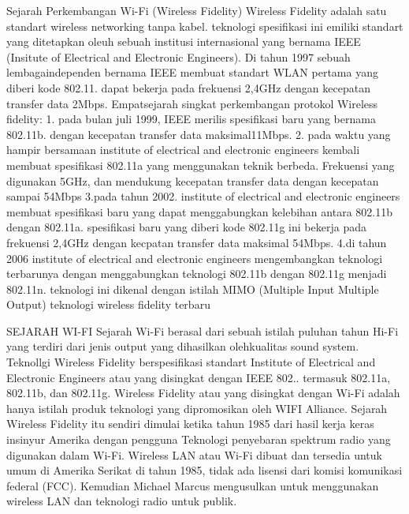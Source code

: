 Sejarah Perkembangan Wi-Fi (Wireless Fidelity)
Wireless Fidelity adalah satu standart wireless networking tanpa kabel. teknologi spesifikasi ini emiliki standart yang ditetapkan oleuh sebuah institusi internasional yang bernama IEEE  (Insitute of Electrical and Electronic Engineers). Di tahun 1997 sebuah lembagaindependen bernama IEEE membuat standart WLAN pertama yang diberi kode 802.11. dapat bekerja pada frekuensi 2,4GHz dengan kecepatan transfer data 2Mbps.
Empatsejarah singkat perkembangan protokol Wireless fidelity:
1. pada bulan juli 1999, IEEE merilis spesifikasi baru yang bernama 802.11b. dengan kecepatan transfer data maksimal11Mbps.
2. pada waktu yang hampir bersamaan institute of electrical and electronic engineers kembali membuat spesifikasi 802.11a yang menggunakan teknik berbeda. Frekuensi yang  digunakan 5GHz, dan mendukung kecepatan transfer data dengan kecepatan sampai 54Mbps
3.pada tahun 2002. institute of electrical and electronic engineers membuat spesifikasi baru yang dapat menggabungkan kelebihan antara 802.11b dengan 802.11a. spesifikasi baru  yang diberi kode 802.11g ini bekerja pada frekuensi 2,4GHz dengan kecpatan transfer data maksimal 54Mbps.
4.di tahun 2006 institute of electrical and electronic engineers mengembangkan teknologi terbarunya dengan menggabungkan teknologi 802.11b dengan 802.11g menjadi 802.11n. teknologi ini dikenal dengan istilah MIMO (Multiple Input Multiple Output) teknologi wireless fidelity terbaru
 
SEJARAH WI-FI
Sejarah Wi-Fi berasal dari sebuah istilah puluhan tahun Hi-Fi yang terdiri dari jenis output yang dihasilkan olehkualitas sound system. Teknollgi Wireless Fidelity berspesifikasi standart Institute of Electrical and Electronic Engineers atau yang disingkat dengan IEEE 802.. termasuk 802.11a, 802.11b, dan 802.11g. Wireless Fidelity atau yang disingkat dengan Wi-Fi adalah hanya istilah produk teknologi yang dipromosikan oleh WIFI Alliance.
Sejarah Wireless Fidelity itu sendiri dimulai ketika tahun 1985 dari hasil kerja keras insinyur Amerika dengan pengguna Teknologi penyebaran spektrum radio yang digunakan dalam Wi-Fi. Wireless LAN atau Wi-Fi dibuat dan tersedia untuk umum di Amerika Serikat di tahun 1985, tidak ada lisensi dari komisi komunikasi federal (FCC). Kemudian Michael Marcus mengusulkan untuk menggunakan wireless LAN dan teknologi radio untuk publik.

